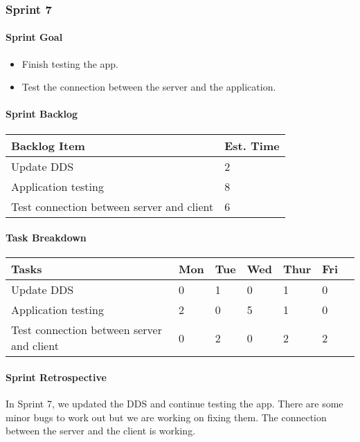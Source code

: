 \subsubsection{Sprint 7}

\paragraph{Sprint Goal}
\begin{itemize}
    \item  Finish testing the app.
    \item  Test the connection between the server and the application.
\end{itemize}

\paragraph{Sprint Backlog}
\begin{table}[htbp]
    \centering
    \begin{tabularx}{\textwidth}{l|l}
        Backlog Item & Est. Time\\
        \hline
        Update DDS & 2\\
        Application testing & 8\\
        Test connection between server and client & 6\\
    \end{tabularx}
\end{table}

\paragraph{Task Breakdown}
\begin{tabular}[htbp]
    \centering
    \begin{tabularx}{\textwidth}{l|l|l|l|l|l|l}
        Tasks &    Mon & Tue & Wed & Thur & Fri\\
        \hline
        Update DDS & 0 & 1 & 0 & 1 & 0\\
        Application testing & 2 & 0 & 5 & 1 & 0\\
        Test connection between server and client & 0 & 2 & 0 & 2 & 2\\
    \end{tabularx}
\end{tabular}

\paragraph{Sprint Retrospective}
In Sprint 7, we updated the DDS and continue testing the app. There are some minor bugs to work out but we are working on fixing them. The connection between the server and the client is working.
